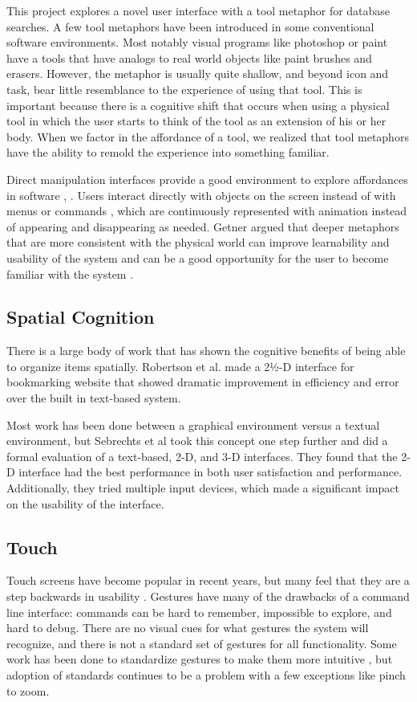 \documentclass{article}
\begin{document}
This project explores a novel user interface with a tool metaphor for database searches.  A few tool metaphors have been introduced in some conventional software environments.  Most notably visual programs like photoshop or paint have a tools that have analogs to real world objects like paint brushes and erasers.  However, the metaphor is usually quite shallow, and beyond icon and task, bear little resemblance to the experience of using that tool.  This is important because there is a cognitive shift that occurs when using a physical tool in which the user starts to think of the tool as an extension of his or her body.  \cite{Maravita2004}  When we factor in the affordance of a tool, we realized that tool metaphors have the ability to remold the experience into something familiar.  

Direct manipulation interfaces provide a good environment to explore affordances in software \cite{Gaver1991}, \cite{Norman1991}.  Users interact directly with objects on the screen instead of with menus or commands \cite{Hutchins1989} \cite{Shneiderman1992}, which are continuously represented with animation instead of appearing and disappearing as needed.\cite{Shneiderman1992}  Getner argued that deeper metaphors that are more consistent with the physical world can improve learnability and usability of the system \cite{Gentner1996} and can be a good opportunity for the user to become familiar with the system \cite{Fischer1994}.  


\subsection{Spatial Cognition}
There is a large body of work that has shown the cognitive benefits of being able to organize items spatially. \cite{Agarawala2006} \cite{Robertson1998} Robertson et al. made a 2½-D interface for bookmarking website that showed dramatic improvement in efficiency and error over the built in text-based system.  
	
	Most work has been done between a graphical environment versus a textual environment, but Sebrechts et al took this concept one step further and did a formal evaluation of a text-based, 2-D, and 3-D interfaces.\cite{Sebrechts1999}  They found that the 2-D interface had the best performance in both user satisfaction and performance.  Additionally, they tried multiple input devices, which made a significant impact on the usability of the interface. 

\subsection{Touch}
Touch screens have become popular in recent years, but many feel that they are a step backwards in usability \cite{Norman2010}.  Gestures have many of the drawbacks of a command line interface: commands can be hard to remember, impossible to explore, and hard to debug.  There are no visual cues for what gestures the system will recognize, and there is not a standard set of gestures for all functionality.   Some work has been done to standardize gestures to make them more intuitive \cite{North2009}, but adoption of standards continues to be a problem with a few exceptions like pinch to zoom.  
\end{document}
